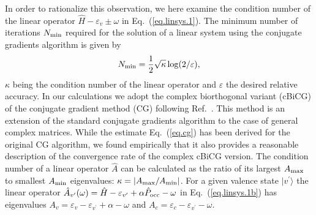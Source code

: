 \documentclass[twocolumn,prb,showpacs,superscriptaddress]{revtex4}
\def\w{\omega}
\def\>{\rangle}
\def\<{\langle}
\def\H{\hat{H}}
\def\P{\hat{P}_{\rm occ}}
\def\E{\varepsilon}
\def\vp{{v^\prime}}
\begin{document}
In order to rationalize this observation, we here examine
the condition number of the linear operator $\H-\E_v\pm\w$ in Eq.\ (\ref{eq.linsys.1}).
The minimum number of iterations $N_{\rm min}$ required for the solution of
a linear system using the conjugate gradients algorithm is given by
  \begin{equation}\label{eq.cg}
  N_{\rm min} = \frac{1}{2}\sqrt{\kappa} \log(2/\varepsilon),
  \end{equation}
$\kappa$ being the condition number of the linear operator and $\varepsilon$ the
desired relative accuracy.\cite{painless.cg} In our calculations we adopt the 
complex biorthogonal variant (cBiCG) of the conjugate gradient method (CG)
following Ref.\ . This method is an extension of the standard 
conjugate gradients algorithm to the 
case of general complex matrices. While the estimate Eq.\ (\ref{eq.cg}) has
been derived for the original CG algorithm, we found empirically that it also 
provides a reasonable description of the convergence rate of the complex cBiCG version.
%
The condition number of a linear operator $\hat{A}$ can be calculated as the ratio 
of its largest $A_{\rm max}$ to smallest $A_{\rm min}$ eigenvalues: 
$\kappa=|A_{\rm max}/A_{\rm min}|$.
For a given valence state 
$|v^\prime\>$ the linear operator $\hat{A}_\vp (\w) = \H - \E_\vp + \alpha \P - \w$ 
in Eq.\ (\ref{eq.linsys.1b}) has eigenvalues
$A_v = \E_v - \E_\vp + \alpha - \w$ and $A_c = \E_c - \E_\vp - \w$. 
\end{document}
